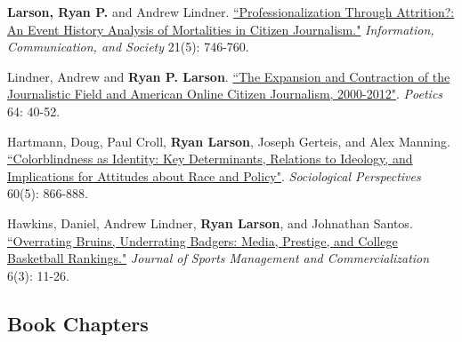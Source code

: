 \documentclass[letterpaper]{article}
\newenvironment{publist}{%
  \begin{list}{}{%
    \setlength{\leftmargin}{0cm}   %
    \setlength{\labelwidth}{2cm}     %
    \setlength{\labelsep}{0.5cm}     %
  }%
}{%
  \end{list}%
}
\begin{document}
\begin{publist}
\item \textbf{Larson, Ryan P.} and Andrew Lindner. \href{https://ryanplarson.github.io/personal_site/pubs/larson_lindner_18.pdf}{``Professionalization Through Attrition?: An Event History Analysis of Mortalities in Citizen Journalism."}  \textit{Information, Communication, and Society} 21(5): 746-760.

\item[\textbf{2017}] Lindner, Andrew and \textbf{Ryan P. Larson}. \href{https://ryanplarson.github.io/personal_site/pubs/lindner_larson_17.pdf}{``The Expansion and Contraction of the Journalistic Field and American Online Citizen Journalism, 2000-2012"}. \textit{Poetics} 64: 40-52.

\item Hartmann, Doug, Paul Croll, \textbf{Ryan Larson}, Joseph Gerteis, and  Alex Manning. \href{https://ryanplarson.github.io/personal_site/pubs/hartmann_etal_17.pdf}{``Colorblindness as Identity:  Key Determinants, Relations to Ideology, and Implications for Attitudes about Race and Policy"}. \textit{Sociological Perspectives} 60(5): 866-888.

\item[\textbf{2015}] Hawkins, Daniel, Andrew Lindner, \textbf{Ryan Larson}, and Johnathan Santos. \href{https://ryanplarson.github.io/personal_site/pubs/hawkins_etal_15.pdf}{``Overrating Bruins, Underrating Badgers: Media, Prestige, and College Basketball Rankings."} \textit{Journal of Sports Management and Commercialization} 6(3): 11-26.

\end{publist}

\subsection*{Book Chapters}
\end{document}
